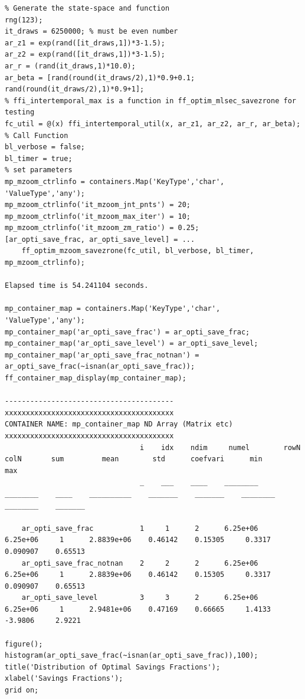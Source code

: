 \documentclass[
]{book}
\begin{document}
\begin{verbatim}
% Generate the state-space and function
rng(123);
it_draws = 6250000; % must be even number
ar_z1 = exp(rand([it_draws,1])*3-1.5);
ar_z2 = exp(rand([it_draws,1])*3-1.5);
ar_r = (rand(it_draws,1)*10.0);
ar_beta = [rand(round(it_draws/2),1)*0.9+0.1; rand(round(it_draws/2),1)*0.9+1]; 
% ffi_intertemporal_max is a function in ff_optim_mlsec_savezrone for testing
fc_util = @(x) ffi_intertemporal_util(x, ar_z1, ar_z2, ar_r, ar_beta);
% Call Function
bl_verbose = false;
bl_timer = true;
% set parameters
mp_mzoom_ctrlinfo = containers.Map('KeyType','char', 'ValueType','any');
mp_mzoom_ctrlinfo('it_mzoom_jnt_pnts') = 20;
mp_mzoom_ctrlinfo('it_mzoom_max_iter') = 10;
mp_mzoom_ctrlinfo('it_mzoom_zm_ratio') = 0.25;
[ar_opti_save_frac, ar_opti_save_level] = ...
    ff_optim_mzoom_savezrone(fc_util, bl_verbose, bl_timer, mp_mzoom_ctrlinfo);

Elapsed time is 54.241104 seconds.

mp_container_map = containers.Map('KeyType','char', 'ValueType','any');
mp_container_map('ar_opti_save_frac') = ar_opti_save_frac;
mp_container_map('ar_opti_save_level') = ar_opti_save_level;
mp_container_map('ar_opti_save_frac_notnan') = ar_opti_save_frac(~isnan(ar_opti_save_frac));
ff_container_map_display(mp_container_map);

----------------------------------------
xxxxxxxxxxxxxxxxxxxxxxxxxxxxxxxxxxxxxxxx
CONTAINER NAME: mp_container_map ND Array (Matrix etc)
xxxxxxxxxxxxxxxxxxxxxxxxxxxxxxxxxxxxxxxx
                                i    idx    ndim     numel        rowN      colN       sum         mean        std      coefvari      min         max  
                                _    ___    ____    ________    ________    ____    __________    _______    _______    ________    ________    _______

    ar_opti_save_frac           1     1      2      6.25e+06    6.25e+06     1      2.8839e+06    0.46142    0.15305     0.3317     0.090907    0.65513
    ar_opti_save_frac_notnan    2     2      2      6.25e+06    6.25e+06     1      2.8839e+06    0.46142    0.15305     0.3317     0.090907    0.65513
    ar_opti_save_level          3     3      2      6.25e+06    6.25e+06     1      2.9481e+06    0.47169    0.66665     1.4133      -3.9806     2.9221

figure();
histogram(ar_opti_save_frac(~isnan(ar_opti_save_frac)),100);
title('Distribution of Optimal Savings Fractions');
xlabel('Savings Fractions');
grid on;
\end{verbatim}
\end{document}
